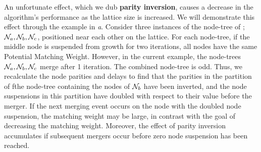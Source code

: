 An unfortunate effect, which we dub \textbf{parity inversion}, causes a decrease in the algorithm's performance as the lattice size is increased. We will demonstrate this effect through the example in \emph{a}. Consider three instances of the node-tree of ; $\mathcal{N}_a, \mathcal{N}_b, \mathcal{N}_c$, positioned near each other on the lattice. For each node-tree, if the middle node is suspended from growth for two iterations, all nodes have the same Potential Matching Weight. However, in the current example, the node-trees $\mathcal{N}_a, \mathcal{N}_b, \mathcal{N}_c$ merge after 1 iteration. The combined node-tree is odd. Thus, we recalculate the node parities and delays to find that the parities in the partition of fthe node-tree containing the nodes of $\mathcal{N}_b$ have been inverted, and the node suspensions in this partition have doubled with respect to their value before the merger. If the next merging event occurs on the node with the doubled node suspension, the matching weight may be large, in contrast with the goal of decreasing the matching weight. Moreover, the effect of parity inversion accumulates if subsequent mergers occur before zero node suspension has been reached. %

